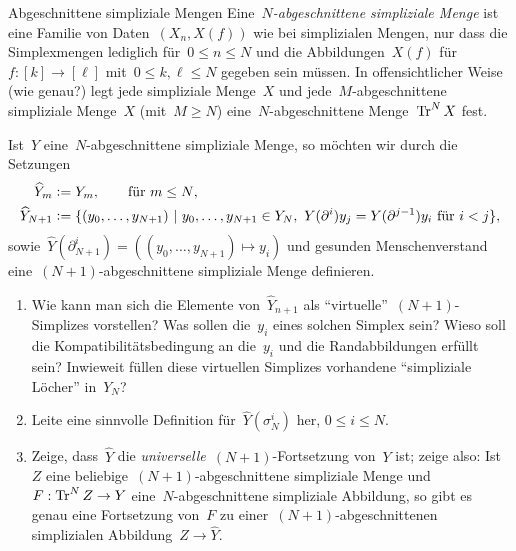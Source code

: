 \documentclass{uebblatt}
\begin{document}
\begin{aufgabe}{Abgeschnittene simpliziale Mengen}
Eine~\emph{$N$-abgeschnittene simpliziale Menge} ist eine Familie von
Daten~$(X_n,X(f))$ wie bei simplizialen Mengen, nur dass die Simplexmengen
lediglich für~$0 \leq n \leq N$ und die Abbildungen~$X(f)$ für~$f : [k] \to
[\ell]$ mit~$0 \leq k,\ell \leq N$ gegeben sein müssen. In offensichtlicher Weise
(wie genau?) legt jede simpliziale Menge~$X$ und jede~$M$-abgeschnittene
simpliziale Menge~$X$ (mit~$M \geq N$) eine~$N$-abgeschnittene Menge~$\operatorname{Tr}^N X$
fest.

Ist~$Y$ eine~$N$-abgeschnittene simpliziale Menge, so möchten wir durch die
Setzungen
\begin{align*}
  \widehat Y_m &\vcentcolon= Y_m, \qquad \text{für $m \leq N$,} \\
  \widehat Y_{N+1} &\vcentcolon= \{ (y_0,\ldots,y_{N+1}) \ |\
    y_0,\ldots,y_{N+1} \in Y_N,\
    \text{$Y(\partial^i)y_j = Y(\partial^{j-1})y_i$ für~$i < j$} \},
\end{align*}
sowie~$\widehat Y(\partial^i_{N+1}) = ((y_0,\ldots,y_{N+1}) \mapsto y_i)$
und gesunden Menschenverstand eine~$(N+1)$-abgeschnittene simpliziale Menge
definieren.

\begin{enumerate}
\item Wie kann man sich die Elemente von~$\widehat Y_{n+1}$ als
"`virtuelle"'~$(N+1)$-Simplizes vorstellen? Was sollen die~$y_i$ eines solchen
Simplex sein? Wieso soll die Kompatibilitätsbedingung an die~$y_i$ und die
Randabbildungen erfüllt sein? Inwieweit füllen diese virtuellen Simplizes
vorhandene "`simpliziale Löcher"' in~$Y_N$?

\item Leite eine sinnvolle Definition für~$\widehat Y(\sigma^i_N)$ her, $0 \leq i \leq N$.

\item Zeige, dass~$\widehat Y$ die \emph{universelle}~$(N+1)$-Fortsetzung
von~$Y$ ist; zeige also: Ist~$Z$ eine beliebige~$(N+1)$-abgeschnittene
simpliziale Menge und~$F : \operatorname{Tr}^N Z \to Y$ eine~$N$-abgeschnittene simpliziale
Abbildung, so gibt es genau eine Fortsetzung von~$F$ zu
einer~$(N+1)$-abgeschnittenen simplizialen Abbildung~$Z \to \widehat Y$.
\end{enumerate}
\end{aufgabe}
\end{document}

